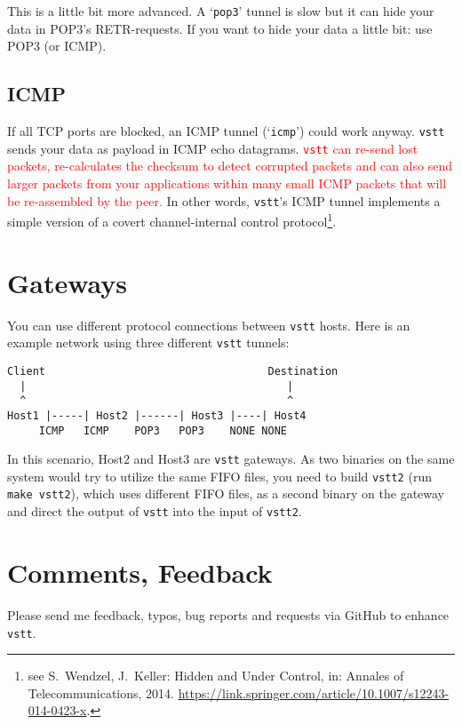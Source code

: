 \documentclass[10pt,a4paper]{article}
\begin{document}
This is a little bit more advanced. A `\texttt{pop3}' tunnel is slow but it can hide your data in POP3's RETR-requests. If you want to hide your data a little bit: use POP3 (or ICMP).

\subsection{ICMP}

If all TCP ports are blocked, an ICMP tunnel (`\texttt{icmp}') could work anyway. \texttt{vstt} sends your data as payload in ICMP echo datagrams. \textcolor{red}{\texttt{vstt} can re-send lost packets, re-calculates the checksum to detect corrupted packets and can also send larger packets from your applications within many small ICMP packets that will be re-assembled by the peer.} In other words, \texttt{vstt}'s ICMP tunnel implements a simple version of a covert channel-internal control protocol\footnote{see S.~Wendzel, J.~Keller: Hidden and Under Control, in: Annales of Telecommunications, 2014. \url{https://link.springer.com/article/10.1007/s12243-014-0423-x}.}.


\section{Gateways}

You can use different protocol connections between \texttt{vstt} hosts. Here is an example network using three different \texttt{vstt} tunnels:

\begin{verbatim}
Client                                   Destination
  |                                         |
  ^                                         ^
Host1 |-----| Host2 |------| Host3 |----| Host4
     ICMP   ICMP    POP3   POP3    NONE NONE
\end{verbatim}

In this scenario, Host2 and Host3 are \texttt{vstt} gateways. As two binaries on the same system would try to utilize the same FIFO files, you need to build \texttt{vstt2} (run \texttt{make vstt2}), which uses different FIFO files, as a second binary on the gateway and direct the output of \texttt{vstt} into the input of \texttt{vstt2}.


\section{Comments, Feedback}

Please send me feedback, typos, bug reports and requests via GitHub to enhance \texttt{vstt}.
\end{document}
